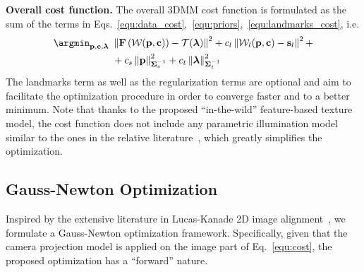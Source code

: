 %
\textbf{Overall cost function.} The overall 3DMM cost function is formulated as
the sum of the terms in Eqs.~\ref{equ:data_cost},~\ref{equ:priors},~\ref{equ:landmarks_cost},
i.e.
%
\begin{equation}
\begin{aligned}
\argmin_{\mathbf{p},\mathbf{c},\boldsymbol{\lambda}}~& \left\lVert\mathbf{F}\left(\mathcal{W}(\mathbf{p},\mathbf{c})\right) - \mathcal{T}(\boldsymbol{\lambda})\right\rVert^2 + c_l\left\lVert\mathcal{W}_l(\mathbf{p},\mathbf{c}) - \mathbf{s}_l\right\rVert^2 +\\
& + c_s\left\lVert\mathbf{p}\right\rVert^2_{\mathbf{\Sigma}_s^{-1}} + c_t\left\lVert\boldsymbol{\lambda}\right\rVert^2_{\mathbf{\Sigma}_t^{-1}}
\label{equ:cost}
\end{aligned}
\end{equation}
%
The landmarks term as well as the regularization terms are optional and aim to
facilitate the optimization procedure in order to converge faster and to a better
minimum. Note that thanks to the proposed ``in-the-wild'' feature-based texture
model, the cost function does not include any parametric illumination model
similar to the ones in the relative literature~\cite{blanz1999morphable,blanz2003face}, which greatly
simplifies the optimization.

%
%
%
\subsection{Gauss-Newton Optimization}
Inspired by the extensive literature in Lucas-Kanade 2D image
alignment~\cite{baker2004lucas,matthews2004active,papandreou2008adaptive,tzimiropoulos2013optimization,antonakos2015feature,alabort2016unified},
we formulate a Gauss-Newton optimization framework. Specifically, given that
the camera projection model is applied on the image part of
Eq.~\ref{equ:cost}, the proposed optimization has a ``forward'' nature.

